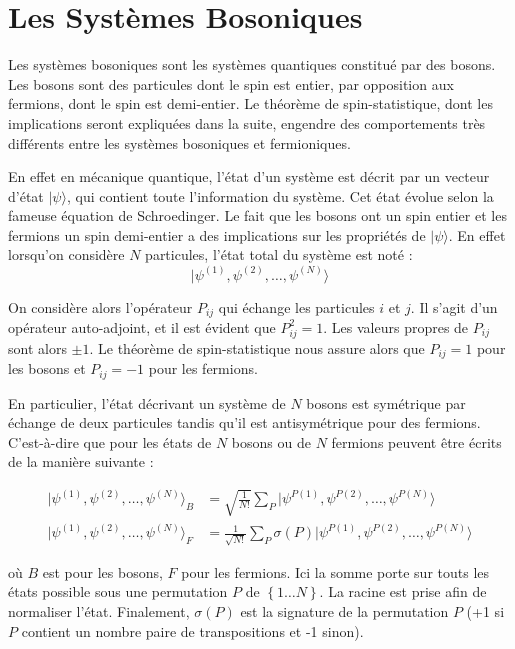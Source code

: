 \documentclass[11pt]{article}
\theoremstyle{definition}
\theoremstyle{remark}
\begin{document}
\section{Les Systèmes Bosoniques}

Les systèmes bosoniques sont les systèmes quantiques constitué par des bosons. Les bosons sont des particules dont le spin est entier, par opposition aux fermions, dont le spin est demi-entier. Le théorème de spin-statistique, dont les implications seront expliquées dans la suite, engendre des comportements très différents entre les systèmes bosoniques et fermioniques.

En effet en mécanique quantique, l'état d'un système est décrit par un vecteur d'état $|\psi \rangle$, qui contient toute l'information du système. Cet état évolue selon la fameuse équation de Schroedinger. Le fait que les bosons ont un spin entier et les fermions un spin demi-entier a des implications sur les propriétés de $| \psi \rangle$. En effet lorsqu'on considère $N$ particules, l'état total du système est noté :
\begin{equation}
|\psi^{(1)},\psi^{(2)},\ldots,\psi^{(N)}\rangle
\end{equation}

On considère alors l'opérateur $P_{ij}$ qui échange les particules $i$ et $j$. Il s'agit d'un opérateur auto-adjoint, et il est évident que $P_{ij}^2=1$. Les valeurs propres de $P_{ij}$ sont alors $\pm 1$. Le théorème de spin-statistique nous assure alors que $P_{ij}=1$ pour les bosons et $P_{ij}=-1$ pour les fermions.

En particulier, l’état décrivant un système de $N$ bosons est symétrique par échange de deux particules tandis qu'il est antisymétrique pour des fermions. C'est-à-dire que pour les états de $N$ bosons ou de $N$ fermions peuvent être écrits de la manière suivante : 

\begin{align} 
\label{symetrie_boson_fermion}
|\psi^{(1)},\psi^{(2)},\ldots,\psi^{(N)}\rangle_B &= \sqrt{\frac{1}{N!}} \sum_P |\psi^{P(1)},\psi^{P(2)},\ldots,\psi^{P(N)}\rangle \\
|\psi^{(1)},\psi^{(2)},\ldots,\psi^{(N)}\rangle_F &= \frac{1}{\sqrt{N!}} \sum_P \sigma (P) |\psi^{P(1)},\psi^{P(2)},\ldots,\psi^{P(N)}\rangle
\end{align}

où $B$ est pour les bosons, $F$ pour les fermions. Ici la somme porte sur touts les états possible sous une permutation $P$ de $\left\lbrace 1\ldots N\right\rbrace$. La racine est prise afin de normaliser l'état. Finalement, $\sigma (P)$ est la signature de la permutation $P$ (+1 si $P$ contient un nombre paire de transpositions et -1 sinon). 
\end{document}
